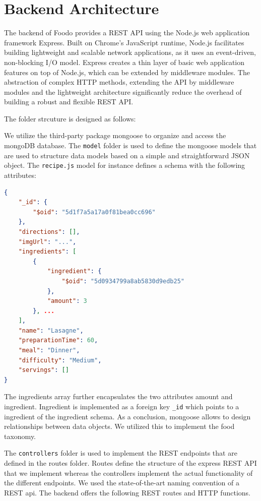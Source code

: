 \section{Backend Architecture}

The backend of Foodo provides a REST API using the Node.js web application framework Express. Built on Chrome's JavaScript runtime, Node.js facilitates building lightweight and scalable network applications, as it uses an event-driven, non-blocking I/O model. Express creates a thin layer of basic web application features on top of Node.js, which can be extended by middleware modules. The abstraction of complex HTTP methods, extending the API by middleware modules and the lightweight architecture significantly reduce the overhead of building a robust and flexible REST API.


The folder strcuture is designed as follows:
\vspace{1em}

We utilize the third-party package mongoose to organize and access the mongoDB database. The \texttt{model} folder is used to define the mongoose models that are used to structure data models based on a simple and straightforward JSON object. The \texttt{recipe.js} model for instance defines a schema with the following attributes:

\begin{lstlisting}[language=json,firstnumber=1,caption={Example of recipe "Lasagne"},captionpos=b]
{
	"_id": {
		"$oid": "5d1f7a5a17a0f81bea0cc696"
	},
	"directions": [],
	"imgUrl": "...",
	"ingredients": [
		{
			"ingredient": {
				"$oid": "5d0934799a8ab5830d9edb25"
			},
			"amount": 3
		}, ...
	],
	"name": "Lasagne",
	"preparationTime": 60,
	"meal": "Dinner",
	"difficulty": "Medium",
	"servings": []
}
\end{lstlisting}

The ingredients array further encapsulates the two attributes amount and ingredient. Ingredient is implemented as a foreign key \texttt{\_id} which points to a ingredient of the ingredient schema. As a conclusion, mongoose allows to design relationships between data objects. We utilized this to implement the food taxonomy. 

The \texttt{controllers} folder is used to implement the REST endpoints that are defined in the routes folder. Routes define the structure of the express REST API that we implement whereas the controllers implement the actual functionality of the different endpoints. We used the state-of-the-art naming convention of a REST api. The backend offers the following REST routes and HTTP functions.

